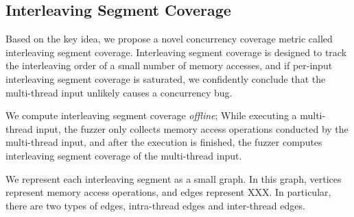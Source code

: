 \subsection{Interleaving Segment Coverage}
\label{ss:coverage}

\newcommand{\mutable}{mutable edge\xspace}
\newcommand{\mutables}{mutable edges\xspace}
\newcommand{\immutable}{immutable edge\xspace}
\newcommand{\immutables}{immutable edges\xspace}


Based on the key idea, we propose a novel concurrency coverage metric
called interleaving segment coverage.
%
Interleaving segment coverage is designed to track the interleaving
order of a small number of memory accesses, and if per-input
interleaving segment coverage is saturated, we confidently conclude
that the multi-thread input unlikely causes a concurrency bug.


We compute interleaving segment coverage \textit{offline}; While
executing a multi-thread input, the fuzzer only collects memory access
operations conducted by the multi-thread input, and after the
execution is finished, the fuzzer computes interleaving segment
coverage of the multi-thread input.


%
We represent each interleaving segment as a small graph.
%
In this graph, vertices represent memory access operations, and edges
represent XXX.
%
In particular, there are two types of edges, intra-thread edges and
inter-thread edges.


%



